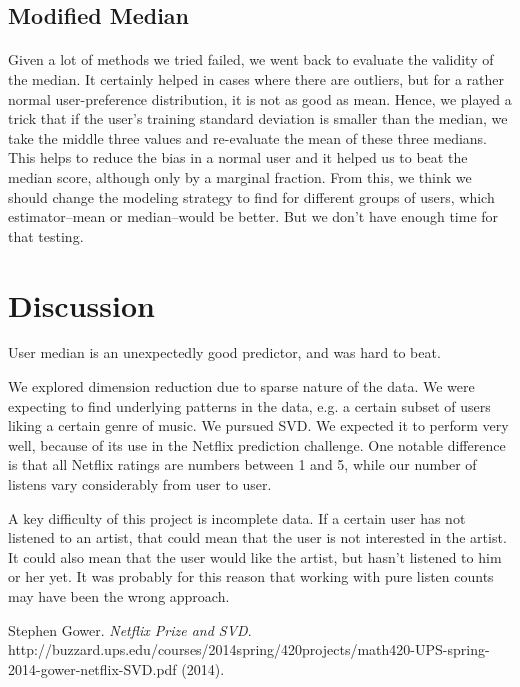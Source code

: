 \documentclass[11pt]{article}
\begin{document}
\paragraph{}
\subsection{Modified Median}
\paragraph{}
Given a lot of methods we tried failed, we went back to evaluate the validity of the median. It certainly helped in cases where there are outliers, but for a rather normal user-preference distribution, it is not as good as mean. Hence, we played a trick that if the user's training standard deviation is smaller than the median, we take the middle three values and re-evaluate the mean of these three medians. This helps to reduce the bias in a normal user and it helped us to beat the median score, although only by a marginal fraction. From this, we think we should change the modeling strategy to find for different groups of users, which estimator--mean or median--would be better. But we don't have enough time for that testing.

\section{Discussion} 

User median is an unexpectedly good predictor, and was hard to beat.

We explored dimension reduction due to sparse nature of the data. We were expecting to find underlying patterns in the data, e.g. a certain subset of users liking a certain genre of music. We pursued SVD. We expected it to perform very well, because of its use in the Netflix prediction challenge. One notable difference is that all Netflix ratings are numbers between 1 and 5, while our number of listens vary considerably from user to user. 

A key difficulty of this project is incomplete data. If a certain user has not listened to an artist, that could mean that the user is not interested in the artist. It could also mean that the user would like the artist, but hasn't listened to him or her yet. It was probably for this reason that working with pure listen counts may have been the wrong approach.

 \begin{thebibliography}{1}

   Stephen Gower. {\em Netflix Prize and SVD}. http://buzzard.ups.edu/courses/2014spring/420projects/math420-UPS-spring-2014-gower-netflix-SVD.pdf (2014).

  \end{thebibliography}
\end{document}
